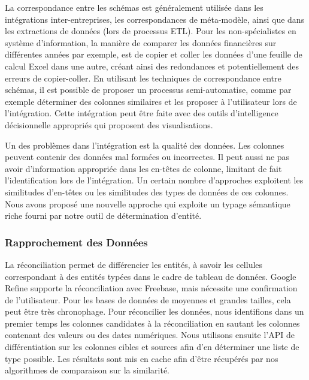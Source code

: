 La correspondance entre les sch\'{e}mas est g\'{e}n\'{e}ralement utilis\'{e}e dans les int\'{e}grations inter-entreprises, les correspondances de m\'{e}ta-mod\`{e}le, ainsi que dans les extractions de donn\'{e}es (lors de processus ETL). Pour les non-sp\'{e}cialistes en syst\`{e}me d'information, la mani\`{e}re de comparer les donn\'{e}es financi\`{e}res sur diff\'{e}rentes ann\'{e}es par exemple, est de copier et coller les donn\'{e}es d'une feuille de calcul Excel dans une autre, cr\'{e}ant ainsi des redondances et potentiellement des erreurs de copier-coller. En utilisant les techniques de correspondance entre sch\'{e}mas, il est possible de proposer un processus semi-automatise, comme par exemple d\'{e}terminer des colonnes similaires et les proposer \`{a} l'utilisateur lors de l'int\'{e}gration. Cette int\'{e}gration peut \^{e}tre faite avec des outils d'intelligence d\'{e}cisionnelle appropri\'{e}s qui proposent des visualisations.

Un des probl\`{e}mes dans l'int\'{e}gration est la qualit\'{e} des donn\'{e}es. Les colonnes peuvent contenir des donn\'{e}es mal form\'{e}es ou incorrectes. Il peut aussi ne pas avoir d'information appropri\'{e}e dans les en-t\^{e}tes de colonne, limitant de fait l'identification lors de l'int\'{e}gration. Un certain nombre d'approches exploitent les similitudes d'en-t\^{e}tes ou les similitudes des types de donn\'{e}es de ces colonnes. Nous avons propos\'{e} une nouvelle approche qui exploite un typage s\'{e}mantique riche fourni par notre outil de d\'{e}termination d'entit\'{e}.

\subsubsection{Rapprochement des Donn\'{e}es}
La r\'{e}conciliation permet de diff\'{e}rencier les entit\'{e}s, \`{a} savoir les cellules correspondant \`{a} des entit\'{e}s typ\'{e}es dans le cadre de tableau de donn\'{e}es. Google Refine supporte la r\'{e}conciliation avec Freebase, mais n\'{e}cessite une confirmation de l'utilisateur. Pour les bases de donn\'{e}es de moyennes et grandes tailles, cela peut \^{e}tre tr\`{e}s chronophage. Pour r\'{e}concilier les donn\'{e}es, nous identifions dans un premier temps les colonnes candidates \`{a} la r\'{e}conciliation en sautant les colonnes contenant des valeurs ou des dates num\'{e}riques. Nous utilisons ensuite l'API de diff\'{e}rentiation sur les colonnes cibles et sources afin d'en d\'{e}terminer une liste de type possible. Les r\'{e}sultats sont mis en cache afin d'\^{e}tre r\'{e}cup\'{e}r\'{e}s par nos algorithmes de comparaison sur la similarit\'{e}.

